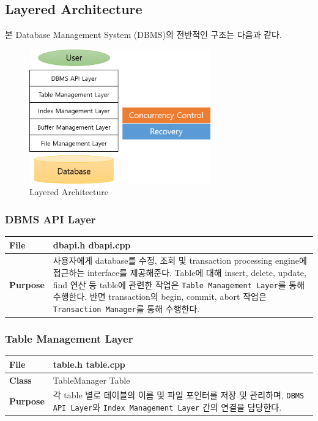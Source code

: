 \documentclass[main.tex]{subfiles}
\begin{document}
\subsection{Layered Architecture}
본 Database Management System (DBMS)의 전반적인 구조는 다음과 같다.

\begin{figure}[h]
	\centering
	\includegraphics[width=0.7\textwidth]{images/layered/layered_architecture.png}
	\caption{Layered Architecture}
\end{figure}

\subsubsection{DBMS API Layer}
\begin{table}[!htb]
	\begin{tabularx}{\textwidth}{|l|X|}
		\hline
		\textbf{File} & dbapi.h dbapi.cpp \\
		\hline
		\textbf{Purpose} & 사용자에게 database를 수정, 조회 및 transaction processing engine에 접근하는 interface를 제공해준다.
		Table에 대해 insert, delete, update, find 연산 등 table에 관련한 작업은 \texttt{Table Management Layer}를 통해 수행한다.
		반면 transaction의 begin, commit, abort 작업은 \texttt{Transaction Manager}를 통해 수행한다. \\
		\hline
	\end{tabularx}
\end{table}


\subsubsection{Table Management Layer}
\begin{table}[!htb]
	\begin{tabularx}{\textwidth}{|l|X|}
		\hline
		\textbf{File} & table.h table.cpp \\
		\hline
		\textbf{Class} & TableManager Table \\
		\hline
		\textbf{Purpose} & 각 table 별로 테이블의 이름 및 파일 포인터를 저장 및 관리하며, \texttt{DBMS API Layer}와 \texttt{Index Management Layer} 간의 연결을 담당한다. \\
		\hline
	\end{tabularx}
\end{table}
\end{document}
